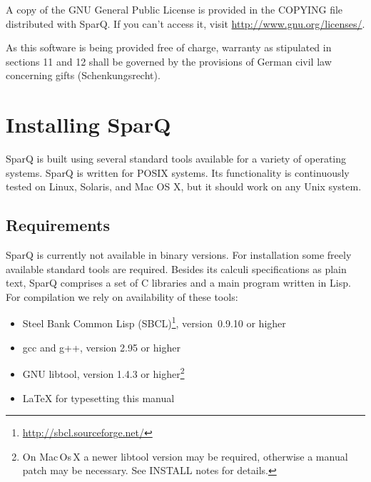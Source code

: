 \documentclass[headsepline]{scrreprt}
\theoremstyle{definition}
\newcommand{\engine}{SparQ}
\begin{document}
A copy of the GNU General Public License is provided in the COPYING file
distributed with SparQ. If you can't access it, visit \url{http://www.gnu.org/licenses/}.

As this software is being provided free of charge,
warranty as stipulated in sections 11 and 12 shall be governed by the
provisions of German civil law concerning gifts (Schenkungsrecht).

\chapter{Installing \engine}
\label{sec:inst-ri-engine}

\engine{} is built using several standard tools available for a variety of operating systems. \engine{} is written for POSIX systems. Its functionality
is continuously tested on Linux, Solaris, and Mac OS X, but it should work on
any Unix system.


\section{Requirements}\label{sec:requirements}

\engine{} is currently not available in binary versions. For installation some freely available standard tools are required. Besides its calculi specifications as plain text, \engine{} comprises a set of C libraries and a main program written in Lisp. For compilation we rely on availability of these tools:

\begin{itemize}
	\item Steel Bank Common Lisp
          (SBCL)\footnote{\url{http://sbcl.sourceforge.net/}}, version~0.9.10 or higher
	\item gcc and g++, version 2.95 or higher
    \item GNU libtool, version 1.4.3 or higher\footnote{On Mac\,Os\,X a
            newer libtool version may be required, otherwise a manual patch may be
            necessary. See INSTALL notes for details.}
	\item \LaTeX{} for typesetting this manual
\end{itemize}
\end{document}
